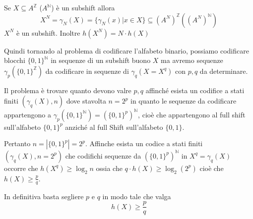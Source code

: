 \begin{teorema}
    Se $X\subseteq A^\mathbb{Z }$ ($A^\mathbb{N}$) è un subshift allora 
    $$X^N= \gamma_N(X)=\{\gamma_N(x)|x\in X\}\subseteq (A^N)^\mathbb{Z} ((A^N)^\mathbb{N})$$
    $X^N$ è un subshift. Inoltre $h(X^N)=N\cdot h(X)$
\end{teorema}

Quindi tornando al problema di codificare l'alfabeto binario, possiamo codificare 
blocchi $\{0,1\}^\mathbb{N}$ in sequenze di un subshift buono $X$ ma avremo sequenze 
$\gamma_p(\{0,1\}^\mathbb{Z})$ da codificare in sequenze di $\gamma_q(X=X^q)$
con $p,q$ da determinare.

Il problema è trovare quanto devono valre $p,q$ affinché esista un codifice a stati 
finiti $(\gamma_q(X),n)$ dove stavolta $n=2^p$ in quanto le sequenze da codificare 
appartengono a $\gamma_p(\{0,1\}^\mathbb{N}) = (\{0,1\}^p)^\mathbb{N}$, cioè 
che appartengono al full shift sull'alfabeto $\{0,1\}^p$ anziché al full Shift
sull'alfabeto $\{0,1\}$.

Pertanto $n=|\{0,1\}^p| = 2^p$. Affinche esista un codice a stati finiti 
$(\gamma_q(X), n =2^p )$ che codifichi sequenze da $(\{0,1\}^p)^\mathbb{N}$ in 
$X^q=\gamma_q(X)$ occorre che $h(X^q)\ge \log_2n$ ossia che $q\cdot h(X)\ge \log_2 (2^p)$
cioè che $h(X)\ge \frac{p}{q}$.

In definitiva basta segliere $p$ e $q$ in modo tale che valga 
$$h(X)\ge \frac{p}{q}$$